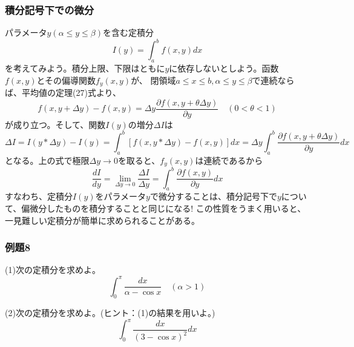 \documentclass[a4j,dvipdfmx]{jsarticle}
\begin{document}
\subsubsection{積分記号下での微分}
パラメータ$y(\alpha\leq y\leq\beta)$を含む定積分
\begin{equation}
    I(y)=\int_a^b f(x,y)dx
\end{equation}
を考えてみよう。積分上限、下限はともに$y$に依存しないとしよう。函数$f(x,y)$とその偏導関数$f_y(x,y)$が、
閉領域$a\leq x\leq b,\alpha\leq y\leq \beta$で連続ならば、平均値の定理(27)式より、
\begin{equation}
    f(x,y+\Delta y)-f(x,y)=\Delta y\frac{\partial f(x,y+\theta\Delta y)}{\partial y}\quad(0<\theta<1)
\end{equation}
が成り立つ。そして、関数$I(y)$の増分$\Delta I$は
\begin{equation}
    \Delta I=I(y*\Delta y)-I(y)=\int_a^b[f(x,y*\Delta y)-f(x,y)]dx=\Delta y\int_a^b\frac{\partial f(x,y+\theta\Delta y)}{\partial y}dx
\end{equation}
となる。上の式で極限$\Delta y\to 0$を取ると、$f_y(x,y)$は連続であるから
\begin{equation}
    \frac{dI}{dy}=\lim_{\Delta y\to 0}\frac{\Delta I}{\Delta y}=\int_a^b\frac{\partial f(x,y)}{\partial y}dx
\end{equation}
すなわち、定積分$I(y)$をパラメータ$y$で微分することは、積分記号下で$y$について、偏微分したものを積分することと同じになる!
この性質をうまく用いると、一見難しい定積分が簡単に求められることがある。
\subsubsection*{例題8}
(1)次の定積分を求めよ。
\begin{equation*}
    \int_0^\pi\frac{dx}{\alpha-\cos x}\quad(\alpha>1)
\end{equation*}

(2)次の定積分を求めよ。(ヒント：(1)の結果を用いよ。)
\begin{equation*}
    \int_0^\pi\frac{dx}{(3-\cos x)^2}dx
\end{equation*}
\end{document}
